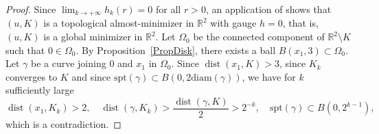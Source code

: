 \documentclass[12pt]{article}
\theoremstyle{definition}
\theoremstyle{remark}
\numberwithin{equation}{section}
\DeclareMathOperator{\dist}{dist}
\newcommand{\R}{\mathbb{R}}
\newcommand{\spt}{\mathrm{spt}}
\begin{document}
\begin{proof}
    Since $\lim_{k \to +\infty} h_k(r) = 0$ for all $r > 0$, an application of \cite[Theorem 2.7]{lablem} shows that
    $(u,K)$ is a topological almost-minimizer in $\R^2$ with gauge $h = 0$, that is, $(u,K)$ is a global
    minimizer in $\R^2$. Let $\Omega_0$ be the connected component of $\R^2\setminus K$ such that $0\in\Omega_0$. By
    Proposition~\ref{PropDisk}, there exists a ball $B(x_1,3)\subset\Omega_0$. Let $\gamma$ be a curve joining $0$
    and $x_1$ in $\Omega_0$. Since $\dist(x_1,K)>3$, since $K_k$ converges to $K$ and since $\spt(\gamma) \subset
    B(0,2\mathrm{diam}(\gamma))$, we have for $k$ sufficiently large
    \begin{equation}
        \dist(x_1,K_k)>2,\quad\dist(\gamma,K_k)>\frac{\dist(\gamma,K)}{2}>2^{-k},\quad \spt(\gamma) \subset B(0,2^{k-1}),
    \end{equation}
    which is a contradiction.
\end{proof}
\end{document}
